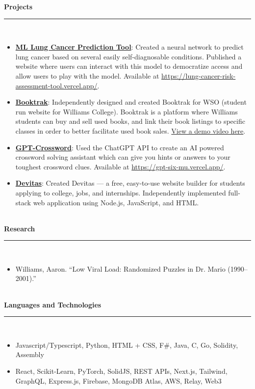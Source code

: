 \documentclass[10pt]{extarticle}
\begin{document}
\textbf{Projects}\\[-2ex]
\rule{\textwidth}{0.4pt}\\ 
\vspace{-\baselineskip}
\begin{itemize}[noitemsep,nolistsep]
\item \textbf{\underline{ML Lung Cancer Prediction Tool}}: Created a neural network to predict lung cancer based on several easily self-diagnosable conditions. Published a website where users can interact with this model to democratize access and allow users to play with the model. Available at \url{https://lung-cancer-risk-assessment-tool.vercel.app/}.
\item \textbf{\underline{Booktrak}}: Independently designed and created Booktrak for WSO (student run website for Williams College). Booktrak is a platform where Williams students can buy and sell used books, and link their book listings to specific classes in order to better facilitate used book sales. \href{https://drive.google.com/file/d/1y5jxcYpGfvBr2p4P4GuF56aErHf5KXS2/view?usp=sharing}{View a demo video here}.
\item \textbf{\underline{GPT-Crossword}}: Used the ChatGPT API to create an AI powered crossword solving assistant which can give you hints or answers to your toughest crossword clues. Available at \url{https://gpt-six-mu.vercel.app/}.
\item \textbf{\underline{Devitas}}: Created Devitas — a free, easy-to-use website builder for students applying to college, jobs, and internships. Independently implemented full-stack web application using Node.js, JavaScript, and HTML.
\end{itemize}~\\[-1ex]
\textbf{Research}\\[-2ex]
\rule{\textwidth}{0.4pt}\\ 
\vspace{-\baselineskip}
\begin{itemize}[noitemsep,nolistsep]
\item Williams, Aaron. “Low Viral Load: Randomized Puzzles in Dr. Mario (1990–2001).”
\end{itemize}~\\[-1ex]
\textbf{Languages and Technologies}\\[-2ex]
\rule{\textwidth}{0.4pt}\\ 
\vspace{-\baselineskip}
\begin{itemize}[noitemsep,nolistsep]
\item Javascript/Typescript, Python, HTML + CSS, F\#, Java, C, Go, Solidity, Assembly
\item React, Scikit-Learn, PyTorch, SolidJS, REST APIs, Next.js, Tailwind, GraphQL, Express.js, Firebase, MongoDB Atlas, AWS, Relay, Web3
\end{itemize}
\end{document}
